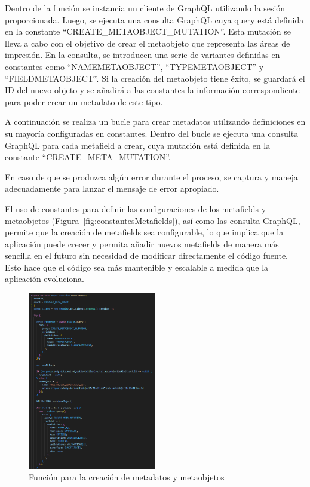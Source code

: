 \documentclass[12pt]{article}
\begin{document}
Dentro de la función se instancia un cliente de GraphQL utilizando la sesión proporcionada. Luego, se ejecuta una consulta GraphQL cuya query está definida en la constante ``CREATE\_METAOBJECT\_MUTATION''.  
Esta mutación se lleva a cabo con el objetivo de crear el metaobjeto que representa las áreas de impresión. En la consulta, se introducen una serie de variantes definidas en constantes como ``NAMEMETAOBJECT'', 
``TYPEMETAOBJECT'' y ``FIELDMETAOBJECT''. Si la creación del metaobjeto tiene éxito, se guardará el ID del nuevo objeto y se añadirá a las constantes 
la información correspondiente para poder crear un metadato de este tipo.

A continuación se realiza un bucle para crear metadatos utilizando definiciones en su mayoría configuradas en constantes. Dentro del bucle se ejecuta una consulta GraphQL para cada metafield a crear, cuya mutación
está definida en la constante  ``CREATE\_META\_MUTATION''.

En caso de que se produzca algún error durante el proceso, se captura y maneja adecuadamente para lanzar el mensaje de error apropiado.

El uso de constantes para definir las configuraciones de los metafields y metaobjetos (Figura~\ref{fig:constantesMetafields}), así como las consulta GraphQL, permite que la creación
de metafields sea configurable, lo que implica que la aplicación puede crecer y permita añadir nuevos metafields de manera más sencilla en el futuro 
sin necesidad de modificar directamente el código fuente. Esto hace que el código sea más mantenible y escalable a medida que la 
aplicación evoluciona.


\begin{figure}[ht]
    \centering
    \includegraphics[width=0.5\textwidth]{imagenes-back/funcionmetaCreator.png}
    \caption{\label{fig:funcionMetafields} Función para la creación de metadatos y metaobjetos}
    \vspace{\fill}
\end{figure}
\end{document}
